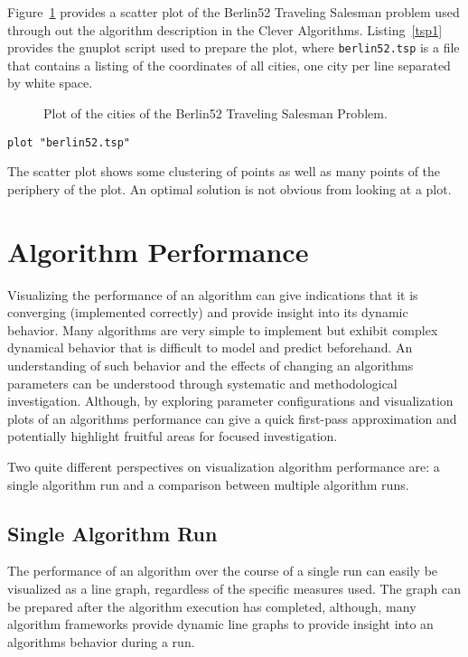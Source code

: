 \documentclass[a4paper, 11pt]{article}
\begin{document}
Figure~\ref{plot:tsp1} provides a scatter plot of the Berlin52 Traveling Salesman problem used through out the algorithm description in the Clever Algorithms. Listing~\ref{tsp1} provides the gnuplot script used to prepare the plot, where \texttt{berlin52.tsp} is a file that contains a listing of the coordinates of all cities, one city per line separated by white space.

\begin{figure}[htp]

\caption{Plot of the cities of the Berlin52 Traveling Salesman Problem.}
\label{plot:tsp1}
\end{figure}

\begin{lstlisting}[caption=Plot cities from the Berlin52 Traveling Salesman Problem, label=tsp1]
plot "berlin52.tsp"
\end{lstlisting}

The scatter plot shows some clustering of points as well as many points of the periphery of the plot. An optimal solution is not obvious from looking at a plot.

%
%
\section{Algorithm Performance}
Visualizing the performance of an algorithm can give indications that it is converging (implemented correctly) and provide insight into its dynamic behavior. Many algorithms are very simple to implement but exhibit complex dynamical behavior that is difficult to model and predict beforehand. An understanding of such behavior and the effects of changing an algorithms parameters can be understood through systematic and methodological investigation. Although, by exploring parameter configurations and visualization plots of an algorithms performance can give a quick first-pass approximation and potentially highlight fruitful areas for focused investigation.

Two quite different perspectives on visualization algorithm performance are: a single algorithm run and a comparison between multiple algorithm runs.

\subsection{Single Algorithm Run}
The performance of an algorithm over the course of a single run can easily be visualized as a line graph, regardless of the specific measures used. The graph can be prepared after the algorithm execution has completed, although, many algorithm frameworks provide dynamic line graphs to provide insight into an algorithms behavior during a run.
\end{document}
